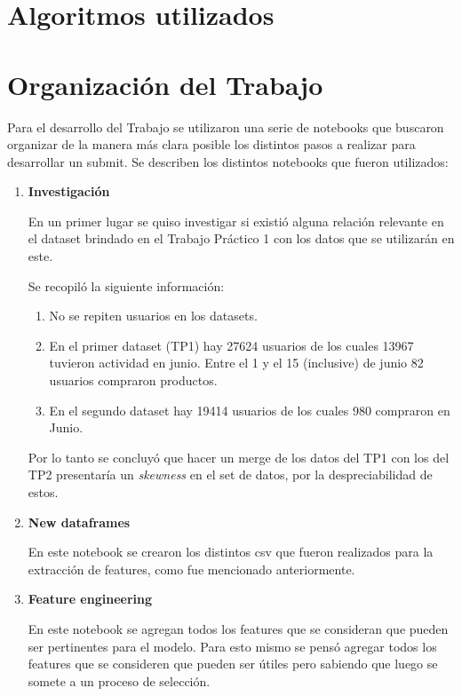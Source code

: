 \documentclass[a4paper]{article}
\begin{document}
\section{Algoritmos utilizados}

\section{Organización del Trabajo}
Para el desarrollo del Trabajo se utilizaron una serie de notebooks que buscaron organizar de la manera más clara posible los distintos pasos a realizar para desarrollar un submit. Se describen los distintos notebooks que fueron utilizados:

\begin{enumerate} 
	
\item \textbf{Investigación}

En un primer lugar se quiso investigar si existió alguna relación relevante en el dataset brindado en el Trabajo Práctico 1 con los datos que se utilizarán en este. 

Se recopiló la siguiente información:

\begin{enumerate}

\item No se repiten usuarios en los datasets.
\item En el primer dataset (TP1) hay 27624 usuarios de los cuales 13967 tuvieron actividad en junio. Entre el 1 y el 15 (inclusive) de junio 82 usuarios compraron productos.
\item En el segundo dataset hay 19414 usuarios de los cuales 980 compraron en Junio.

\end{enumerate}

Por lo tanto se concluyó que hacer un merge de los datos del TP1 con los del TP2 presentaría un \textit{skewness} en el set de datos, por la despreciabilidad de estos.
	
\item \textbf{New dataframes}	

En este notebook se crearon los distintos csv que fueron realizados para la extracción de features, como fue mencionado anteriormente. 

\item \textbf{Feature engineering}

En este notebook se agregan todos los features que se consideran que pueden ser pertinentes para el modelo. Para esto mismo se pensó agregar todos los features que se consideren que pueden ser útiles pero sabiendo que luego se somete a un proceso de selección. 


\end{enumerate}
\end{document}
